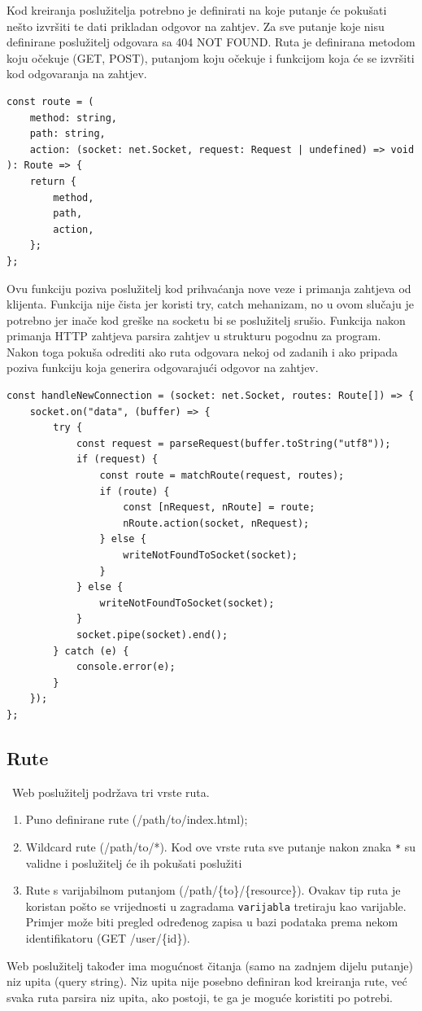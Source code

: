 \documentclass[]{foi} %
\begin{document}
Kod kreiranja poslužitelja potrebno je definirati na koje putanje će pokušati nešto izvršiti
te dati prikladan odgovor na zahtjev. Za sve putanje koje nisu definirane poslužitelj odgovara
sa 404 NOT FOUND. Ruta je definirana metodom koju očekuje (GET, POST), putanjom koju očekuje
i funkcijom koja će se izvršiti kod odgovaranja na zahtjev.
\begin{lstlisting}[caption={Definicija rute}, label=lst:ruta]
const route = (
    method: string,
    path: string,
    action: (socket: net.Socket, request: Request | undefined) => void
): Route => {
    return {
        method,
        path,
        action,
    };
};
\end{lstlisting}

Ovu funkciju poziva poslužitelj kod prihvaćanja nove veze i primanja zahtjeva od
klijenta. Funkcija nije čista jer koristi try, catch mehanizam, no u ovom slučaju
je potrebno jer inače kod greške na socketu bi se poslužitelj srušio. Funkcija nakon
primanja HTTP zahtjeva parsira zahtjev u strukturu pogodnu za program. Nakon toga pokuša
odrediti ako ruta odgovara nekoj od zadanih i ako pripada poziva funkciju koja generira
odgovarajući odgovor na zahtjev.
\begin{lstlisting}[caption={Prihvaćanje nove veze i zahtjeva}, label=lst:conn]
const handleNewConnection = (socket: net.Socket, routes: Route[]) => {
    socket.on("data", (buffer) => {
        try {
            const request = parseRequest(buffer.toString("utf8"));
            if (request) {
                const route = matchRoute(request, routes);
                if (route) {
                    const [nRequest, nRoute] = route;
                    nRoute.action(socket, nRequest);
                } else {
                    writeNotFoundToSocket(socket);
                }
            } else {
                writeNotFoundToSocket(socket);
            }
            socket.pipe(socket).end();
        } catch (e) {
            console.error(e);
        }
    });
};
\end{lstlisting}

\subsection{Rute} \
Web poslužitelj podržava tri vrste ruta.
\begin{enumerate}
	\item Puno definirane rute (/path/to/index.html);
	\item Wildcard rute (/path/to/*). Kod ove vrste ruta sve putanje nakon znaka \texttt{*}
	      su validne i poslužitelj će ih pokušati poslužiti
	\item Rute s varijabilnom putanjom (/path/\{to\}/\{resource\}). Ovakav tip ruta je koristan
	      pošto se vrijednosti u zagradama \texttt{varijabla} tretiraju kao varijable.
	      Primjer može biti pregled određenog zapisa u bazi podataka prema nekom identifikatoru
	      (GET /user/\{id\}).
\end{enumerate}
Web poslužitelj također ima mogućnost čitanja (samo na zadnjem dijelu putanje) niz upita (query
string). Niz upita nije posebno definiran kod kreiranja rute, već svaka ruta parsira
niz upita, ako postoji, te ga je moguće koristiti po potrebi.
\end{document}
